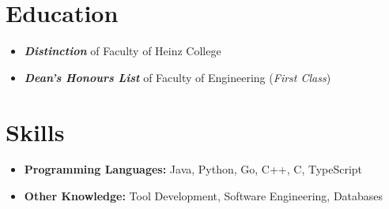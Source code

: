 \documentclass{resume}
\begin{document}



\section{Education}
\begin{itemize}[parsep=0.5ex]
  \item \textbf{\textit{Distinction}} of Faculty of Heinz College
\end{itemize}
\begin{itemize}[parsep=0.5ex]
  \item \textbf{\textit{Dean's Honours List}} of Faculty of Engineering (\textit{First Class})
\end{itemize}

\section{Skills}
\begin{itemize}[parsep=0.5ex]
  \item \textbf{Programming Languages:} Java, Python, Go, C++, C, TypeScript
  \item \textbf{Other Knowledge:} Tool Development, Software Engineering, Databases
\end{itemize}
\end{document}
